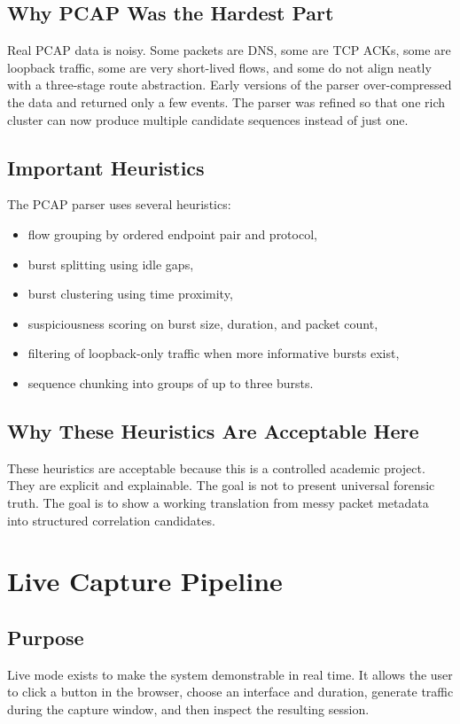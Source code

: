 \documentclass[12pt,a4paper]{report}
\begin{document}
\section{Why PCAP Was the Hardest Part}
Real PCAP data is noisy. Some packets are DNS, some are TCP ACKs, some are loopback traffic, some are very short-lived flows, and some do not align neatly with a three-stage route abstraction. Early versions of the parser over-compressed the data and returned only a few events. The parser was refined so that one rich cluster can now produce multiple candidate sequences instead of just one.

\section{Important Heuristics}
The PCAP parser uses several heuristics:
\begin{itemize}[leftmargin=1.5em]
    \item flow grouping by ordered endpoint pair and protocol,
    \item burst splitting using idle gaps,
    \item burst clustering using time proximity,
    \item suspiciousness scoring on burst size, duration, and packet count,
    \item filtering of loopback-only traffic when more informative bursts exist,
    \item sequence chunking into groups of up to three bursts.
\end{itemize}

\section{Why These Heuristics Are Acceptable Here}
These heuristics are acceptable because this is a controlled academic project. They are explicit and explainable. The goal is not to present universal forensic truth. The goal is to show a working translation from messy packet metadata into structured correlation candidates.

\chapter{Live Capture Pipeline}
\section{Purpose}
Live mode exists to make the system demonstrable in real time. It allows the user to click a button in the browser, choose an interface and duration, generate traffic during the capture window, and then inspect the resulting session.
\end{document}
